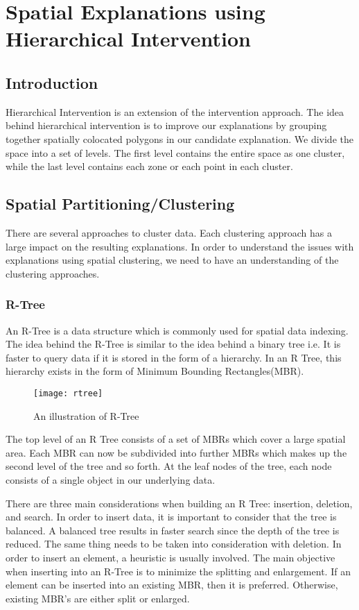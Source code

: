 \chapter{Spatial Explanations using Hierarchical Intervention}
\label{chp:proposed}
\label{sec:hei_intervention}

\section{Introduction}
Hierarchical Intervention is an extension of the intervention approach. The idea behind hierarchical intervention is to improve our explanations by grouping together spatially colocated polygons in our candidate explanation. We divide the space into a set of levels. The first level contains the entire space as one cluster, while the last level contains each zone or each point in each cluster.

\section{Spatial Partitioning/Clustering}
There are several approaches to cluster data. Each clustering approach has a large impact on the resulting explanations. In order to understand the issues with explanations using spatial clustering, we need to have an understanding of the clustering approaches.

\subsection{R-Tree}
An R-Tree is a data structure which is commonly used for spatial data indexing. The idea behind the R-Tree is similar to the idea behind a binary tree i.e. It is faster to query data if it is stored in the form of a hierarchy\citep{guttman1984r}. In an R Tree, this hierarchy exists in the form of Minimum Bounding Rectangles(MBR).

\begin{figure}[ht]
\texttt{[image: rtree]}
\caption{An illustration of R-Tree}
\label{fig:rtree}
\end{figure}

The top level of an R Tree consists of a set of MBRs which cover a large spatial area. Each MBR can now be subdivided into further MBRs which makes up the second level of the tree and so forth. At the leaf nodes of the tree, each node consists of a single object in our underlying data.

There are three main considerations when building an R Tree: insertion, deletion, and search. In order to insert data, it is important to consider that the tree is balanced. A balanced tree results in faster search since the depth of the tree is reduced. The same thing needs to be taken into consideration with deletion.
In order to insert an element, a heuristic is usually involved. The main objective when inserting into an R-Tree is to minimize the splitting and enlargement. If an element can be inserted into an existing MBR, then it is preferred. Otherwise, existing MBR's are either split or enlarged.

